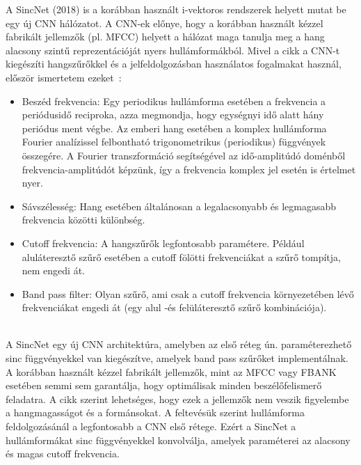 A SincNet (2018) is a korábban használt i-vektoros rendszerek helyett mutat be egy új CNN hálózatot. A CNN-ek előnye, hogy a korábban használt kézzel fabrikált jellemzők (pl. MFCC) helyett a hálózat maga tanulja meg a hang alacsony szintű reprezentációját nyers hullámformákból. Mivel a cikk a CNN-t kiegészíti hangszűrőkkel és a jelfeldolgozásban használatos fogalmakat használ, először ismertetem ezeket~\cite{sincnet}:
\begin{itemize}
	\item Beszéd frekvencia: Egy periodikus hullámforma esetében a frekvencia a periódusidő reciproka, azza megmondja, hogy egységnyi idő alatt hány periódus ment végbe. Az emberi hang esetében a komplex hullámforma Fourier analízissel felbontható trigonometrikus (periodikus) függvények összegére. A Fourier transzformáció segítségével az idő-amplitúdó doménből frekvencia-amplitúdót képzünk, így a frekvencia komplex jel esetén is értelmet nyer.
	\item Sávszélesség: Hang esetében általánosan a legalacsonyabb és legmagasabb frekvencia közötti különbség.
	\item Cutoff frekvencia: A hangszűrők legfontosabb paramétere. Például aluláteresztő szűrő esetében a cutoff fölötti frekvenciákat a szűrő tompítja, nem engedi át.
	\item Band pass filter: Olyan szűrő, ami csak a cutoff frekvencia környezetében lévő frekvenciákat engedi át (egy alul -és felüláteresztő szűrő kombinációja).
\end{itemize} 
\ \\
\newline
A SincNet egy új CNN architektúra, amelyben az első réteg ún. paraméterezhető sinc függvényekkel van kiegészítve, amelyek band pass szűrőket implementálnak.
\newline
\newline
A korábban használt kézzel fabrikált jellemzők, mint az MFCC vagy FBANK esetében semmi sem garantálja, hogy optimálisak minden beszélőfelismerő feladatra. A cikk szerint lehetséges, hogy ezek a jellemzők nem veszik figyelembe a hangmagasságot és a formánsokat. A feltevésük szerint hullámforma feldolgozásánál a legfontosabb a CNN első rétege. Ezért a SincNet a hullámformákat sinc függvényekkel konvolválja, amelyek paraméterei az alacsony és magas cutoff frekvencia.

